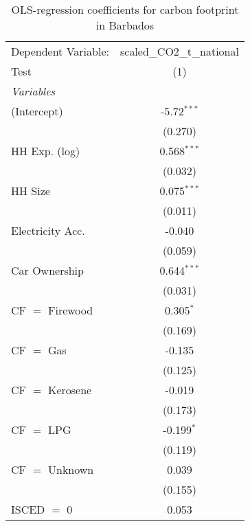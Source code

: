 
\begin{table}[htbp!]
   \centering
   \small
   \begin{adjustbox}{width = 1\textwidth, max height = 0.95\textheight, center}
      \begin{threeparttable}[b]
         \caption{\label{tab:OLS_2_BRB} OLS-regression coefficients for carbon footprint in Barbados}
         \begin{tabular}{lc}
            \tabularnewline \midrule \midrule
            Dependent Variable: & scaled\_CO2\_t\_national\\     
            Test                & (1)\\  
            \midrule
            \emph{Variables}\\
            (Intercept)         & -5.72$^{***}$\\   
                                & (0.270)\\   
            HH Exp. (log)       & 0.568$^{***}$\\   
                                & (0.032)\\   
            HH Size             & 0.075$^{***}$\\   
                                & (0.011)\\   
            Electricity Acc.    & -0.040\\   
                                & (0.059)\\   
            Car Ownership       & 0.644$^{***}$\\   
                                & (0.031)\\   
            CF $=$ Firewood     & 0.305$^{*}$\\   
                                & (0.169)\\   
            CF $=$ Gas          & -0.135\\   
                                & (0.125)\\   
            CF $=$ Kerosene     & -0.019\\   
                                & (0.173)\\   
            CF $=$ LPG          & -0.199$^{*}$\\   
                                & (0.119)\\   
            CF $=$ Unknown      & 0.039\\   
                                & (0.155)\\   
            ISCED $=$ 0         & 0.053\\   

\end{tabular}
\end{threeparttable}
\end{adjustbox}
\end{table}
